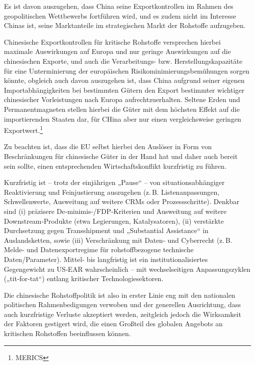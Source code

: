 \documentclass[12pt,a4paper,oneside]{book} %
\begin{document}
Es ist davon auszugehen, dass China seine Exportkontrollen im Rahmen des geopolitischen Wettbewerbs fortführen wird, und es zudem nicht im Interesse Chinas ist, seine Marktanteile im strategischen Markt der Rohstoffe aufzugeben.

Chinesische Exportkontrollen für kritische Rohstoffe versprechen hierbei maximale Auswirkungen auf Europa und nur geringe Auswirkungen auf die chinesischen Exporte, und auch die Verarbeitungs- bzw. Herstellungskapazitäte für eine Unterminierung der europäischen Risikominimierungsbemühungen sorgen könnte, obgleich auch davon auszugehen ist, dass China aufgrund seiner eigenen Importabhängigkeiten bei bestimmten Gütern den Export bestimmter wichtiger chinesischer Vorleistungen nach Europa aufrechtzuerhalten.\autocite{MERICS China Essentials Special Issue: EU-China economic relations enter a critical phase} Seltene Erden und Permanentmagneten stellen hierbei die Güter mit dem höchsten Effekt auf die importierenden Staaten dar, für CHina aber nur einen vergleichsweise geringen Exportwert.\footnote{MERICS}

Zu beachten ist, dass die EU selbst hierbei den Auslöser in Form von Beschränkungen für chinesische Güter in der Hand hat und daher auch bereit sein sollte, einen entsprechenden Wirtschaftskonflikt kurzfristig zu führen.\autocite{MERICS China Essentials Special Issue: EU-China economic relations enter a critical phase} 

Kurzfristig ist – trotz der einjährigen „Pause“ – von situationsabhängiger Reaktivierung und Feinjustierung auszugehen (z. B. Listenanpassungen, Schwellenwerte, Ausweitung auf weitere CRMs oder Prozessschritte).  Denkbar sind (i) präzisere De‑minimis‑/FDP‑Kriterien und Ausweitung auf weitere Downstream‑Produkte (etwa Legierungen, Katalysatoren), (ii) verstärkte Durchsetzung gegen Transshipment und „Substantial Assistance“ in Auslandsketten, sowie (iii) Verschränkung mit Daten‑ und Cyberrecht (z. B. Melde‑ und Datenexportregime für rohstoffbezogene technische Daten/Parameter).  Mittel‑ bis langfristig ist ein institutionalisiertes Gegengewicht zu US‑EAR wahrscheinlich – mit wechselseitigen Anpassungszyklen („tit‑for‑tat“) entlang kritischer Technologiesektoren.

Die chinesische Rohstoffpolitik ist also in erster Linie eng mit den nationalen politischen Rahmenbedigungen verwoben und der generellen Ausrichtung, dass auch kurzfristige Verluste akzeptiert werden, zeitgleich jedoch die Wirksamkeit der Faktoren gestigert wird, die einen Großteil des globalen Angebots an kritischen Rohstoffen beeinflussen können.
\end{document}
